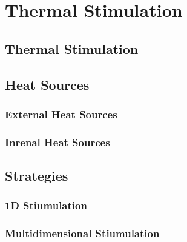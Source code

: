 \chapter{Thermal Stimulation}
\label{chp:thermal_stimulation}



\section{Thermal Stimulation}
\label{sec:thermal_stimulation}

\section{Heat Sources}
\label{sec:heat_sources}

\subsection{External Heat Sources}
\label{sec:external_heat_sources}

\subsection{Inrenal Heat Sources}
\label{sec:internal_heat_sources}

\section{Strategies}
\label{sec:strategies}

\subsection{1D Stiumulation}
\label{sec:1D_stimulation}

\subsection{Multidimensional Stiumulation}
\label{sec:multideimensional_stimulation}





 


